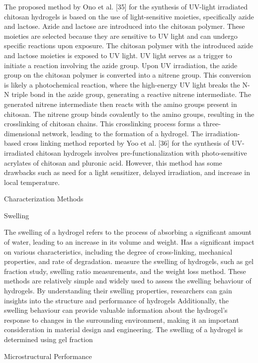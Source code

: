 \documentclass[../../main-notes.tex]{subfiles}
\begin{document}
The proposed method by Ono et al. [35] for the synthesis of UV-light irradiated chitosan hydrogels is based on the use of light-sensitive moieties, specifically azide and lactose. 
Azide and lactose are introduced into the chitosan polymer. 
These moieties are selected because they are sensitive to UV light and can undergo specific reactions upon exposure. 
The chitosan polymer with the introduced azide and lactose moieties is exposed to UV light. 
UV light serves as a trigger to initiate a reaction involving the azide group. 
Upon UV irradiation, the azide group on the chitosan polymer is converted into a nitrene group. 
This conversion is likely a photochemical reaction, where the high-energy UV light breaks the N-N triple bond in the azide group, generating a reactive nitrene intermediate. 
The generated nitrene intermediate then reacts with the amino groups present in chitosan. 
The nitrene group binds covalently to the amino groups, resulting in the crosslinking of chitosan chains. 
This crosslinking process forms a three-dimensional network, leading to the formation of a hydrogel. 
The irradiation-based cross linking method reported by Yoo et al. [36] for the synthesis of UV-irradiated chitosan hydrogels involves pre-functionalization with photo-sensitive acrylates of chitosan and pluronic acid. 
However, this method has some drawbacks such as need for a light sensitizer, delayed irradiation, and increase in local temperature.


Characterization Methods

Swelling

The swelling of a hydrogel refers to the process of absorbing a significant amount of water, leading to an increase in its volume and weight. 
Has a significant impact on various characteristics, including the degree of cross-linking, mechanical properties, and rate of degradation.
measure the swelling of hydrogels, such as gel fraction study, swelling ratio measurements, and the weight loss method. 
These methods are relatively simple and widely used to assess the swelling behaviour of hydrogels.
By understanding their swelling properties, researchers can gain insights into the structure and performance of hydrogels
Additionally, the swelling behaviour can provide valuable information about the hydrogel’s response to changes in the surrounding environment, making it an important consideration in material design and engineering. The swelling of a hydrogel is determined using gel fraction



Microstructural Performance 
\end{document}
